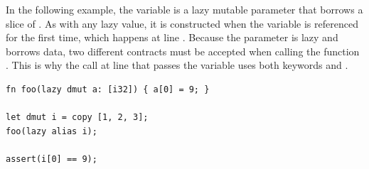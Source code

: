 In the following example, the variable  is a lazy mutable parameter
that borrows a slice of . As with any lazy value, it is constructed
when the variable  is referenced for the first time, which happens at
line . Because the parameter  is lazy and borrows data, two
different contracts must be accepted when calling the function . This
is why the call at line  that passes the variable  uses both
keywords  and .

\begin{lstlisting}[style=coloredverbatim, caption=Example of lazy mutable parameter]
fn foo(lazy dmut a: [i32]) { a[0] = 9; }

let dmut i = copy [1, 2, 3];
foo(lazy alias i);

assert(i[0] == 9);
\end{lstlisting}


\vfill%
\pagebreak
